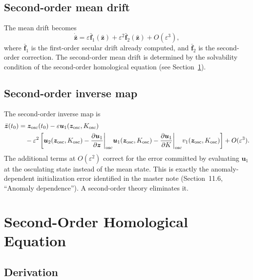 \documentclass[11pt]{article}
\newcommand{\eps}{\varepsilon}
\begin{document}
\subsection{Second-order mean drift}

The mean drift becomes
\begin{equation}
\dot{\bar{\bm z}} = \eps \bar{\bm f}_1(\bar{\bm z})
+ \eps^2 \bar{\bm f}_2(\bar{\bm z})
+ O(\eps^3),
\end{equation}
where $\bar{\bm f}_1$ is the first-order secular drift already computed, and
$\bar{\bm f}_2$ is the second-order correction. The second-order mean drift
is determined by the solvability condition of the second-order homological
equation (see Section~\ref{sec:homological2}).

\subsection{Second-order inverse map}

The second-order inverse map is
\begin{align}
\bar{\bm z}(t_0)
&= \bm z_{\mathrm{osc}}(t_0)
- \eps \bm u_1(\bm z_{\mathrm{osc}}, K_{\mathrm{osc}})
\notag\\
&\quad
- \eps^2 \left[
\bm u_2(\bm z_{\mathrm{osc}}, K_{\mathrm{osc}})
- \frac{\partial \bm u_1}{\partial \bm z}\bigg|_{\mathrm{osc}}
  \bm u_1(\bm z_{\mathrm{osc}}, K_{\mathrm{osc}})
- \frac{\partial \bm u_1}{\partial K}\bigg|_{\mathrm{osc}}
  v_1(\bm z_{\mathrm{osc}}, K_{\mathrm{osc}})
\right]
+ O(\eps^3).
\label{eq:inverse2}
\end{align}
The additional terms at $O(\eps^2)$ correct for the error committed by
evaluating $\bm u_1$ at the osculating state instead of the mean state.
This is exactly the anomaly-dependent initialization error identified in
the master note (Section~11.6, ``Anomaly dependence''). A second-order
theory eliminates it.


\section{Second-Order Homological Equation}
\label{sec:homological2}

\subsection{Derivation}
\end{document}
